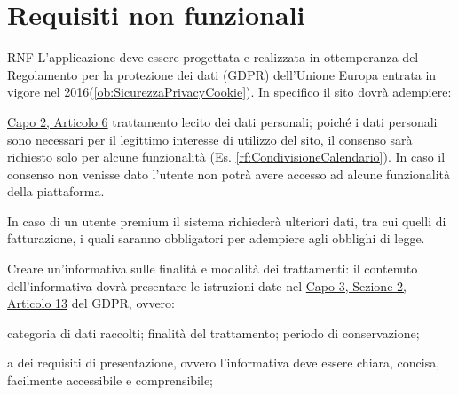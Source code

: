 \section{Requisiti non funzionali}
\label{sec:RequisitiNonFunzionali}

\begin{listaPersonale}{RNF}
       L'applicazione deve essere progettata e realizzata in ottemperanza del Regolamento per la protezione dei dati (GDPR) dell'Unione Europa entrata in vigore nel 2016(\ref{ob:SicurezzaPrivacyCookie}). In specifico il sito dovrà adempiere:
\begin{listaPersonale2}[RNF]{}
             \href{https://eur-lex.europa.eu/legal-content/IT/TXT/?uri=uriserv:OJ.L_.2016.119.01.0001.01.ITA&toc=OJ:L:2016:119:TOC#d1e1898-1-1}{Capo 2, Articolo 6} trattamento lecito dei dati personali; poiché i dati personali sono necessari per il legittimo interesse di utilizzo del sito, il consenso sarà richiesto solo per alcune funzionalità (Es. \ref{rf:CondivisioneCalendario}). In caso il consenso non venisse dato l'utente non potrà avere accesso ad alcune funzionalità della piattaforma.
\begin{listaPersonale3}[RNF]{}
                   In caso di un utente premium il sistema richiederà ulteriori dati, tra cui quelli di fatturazione, i quali saranno obbligatori per adempiere agli obblighi di legge.
            \end{listaPersonale3}

             Creare un'informativa sulle finalità e modalità dei trattamenti: il contenuto dell'informativa dovrà presentare le istruzioni date nel \href{https://eur-lex.europa.eu/legal-content/IT/TXT/?uri=uriserv:OJ.L_.2016.119.01.0001.01.ITA&toc=OJ:L:2016:119:TOC#d1e2261-1-1}{Capo 3, Sezione 2, Articolo 13} del GDPR, ovvero:
\begin{listaPersonale3}[RNF]{}
                   categoria di dati raccolti;
                   finalità del trattamento;
                   periodo di conservazione;
            \end{listaPersonale3}

             a dei requisiti di presentazione, ovvero l'informativa deve essere chiara, concisa, facilmente accessibile e comprensibile;


\end{listaPersonale2}
\end{listaPersonale}
